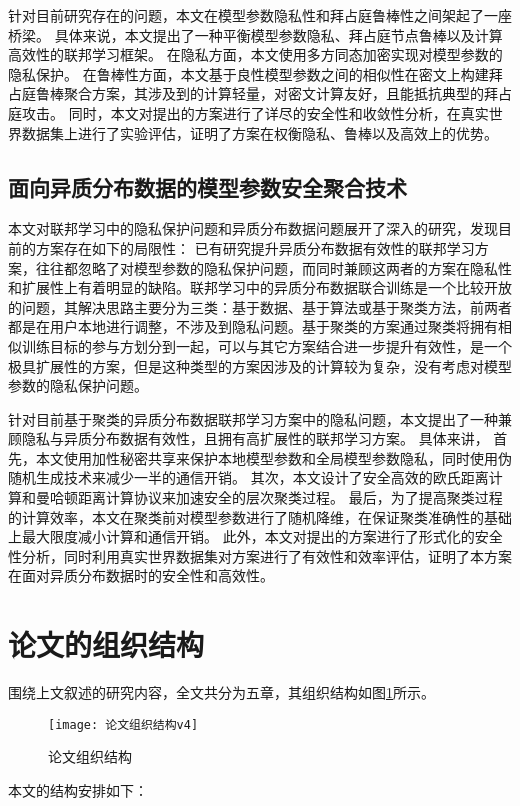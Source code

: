 针对目前研究存在的问题，本文在模型参数隐私性和拜占庭鲁棒性之间架起了一座桥梁。
具体来说，本文提出了一种平衡模型参数隐私、拜占庭节点鲁棒以及计算高效性的联邦学习框架。
在隐私方面，本文使用多方同态加密实现对模型参数的隐私保护。
在鲁棒性方面，本文基于良性模型参数之间的相似性在密文上构建拜占庭鲁棒聚合方案，其涉及到的计算轻量，对密文计算友好，且能抵抗典型的拜占庭攻击。
同时，本文对提出的方案进行了详尽的安全性和收敛性分析，在真实世界数据集上进行了实验评估，证明了方案在权衡隐私、鲁棒以及高效上的优势。

\subsection{面向异质分布数据的模型参数安全聚合技术}
本文对联邦学习中的隐私保护问题和异质分布数据问题展开了深入的研究，发现目前的方案存在如下的局限性：
已有研究提升异质分布数据有效性的联邦学习方案，往往都忽略了对模型参数的隐私保护问题，而同时兼顾这两者的方案在隐私性和扩展性上有着明显的缺陷。联邦学习中的异质分布数据联合训练是一个比较开放的问题，其解决思路主要分为三类：基于数据、基于算法或基于聚类方法，前两者都是在用户本地进行调整，不涉及到隐私问题。基于聚类的方案通过聚类将拥有相似训练目标的参与方划分到一起，可以与其它方案结合进一步提升有效性，是一个极具扩展性的方案，但是这种类型的方案因涉及的计算较为复杂，没有考虑对模型参数的隐私保护问题。

针对目前基于聚类的异质分布数据联邦学习方案中的隐私问题，本文提出了一种兼顾隐私与异质分布数据有效性，且拥有高扩展性的联邦学习方案。
具体来讲，
首先，本文使用加性秘密共享来保护本地模型参数和全局模型参数隐私，同时使用伪随机生成技术来减少一半的通信开销。
其次，本文设计了安全高效的欧氏距离计算和曼哈顿距离计算协议来加速安全的层次聚类过程。
最后，为了提高聚类过程的计算效率，本文在聚类前对模型参数进行了随机降维，在保证聚类准确性的基础上最大限度减小计算和通信开销。
此外，本文对提出的方案进行了形式化的安全性分析，同时利用真实世界数据集对方案进行了有效性和效率评估，证明了本方案在面对异质分布数据时的安全性和高效性。

\section{论文的组织结构}
围绕上文叙述的研究内容，全文共分为五章，其组织结构如图\ref{struct}所示。

\begin{figure}[!h]
	\centering
	\texttt{[image: 论文组织结构v4]}
	\caption{论文组织结构}
	\label{struct}
\end{figure}

本文的结构安排如下：

